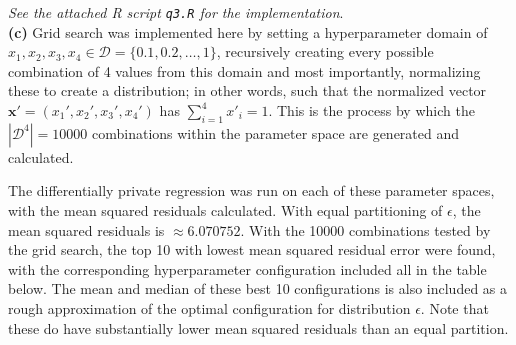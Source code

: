 \documentclass[12pt]{article}
\begin{document}
\emph{See the attached R script \texttt{q3.R} for the implementation}.\\

\textbf{(c)} Grid search was implemented here by setting a hyperparameter domain of $x_1, x_2, x_3, x_4 \in \mathcal{D} = \{0.1, 0.2, \dots, 1\}$, recursively creating every possible combination of 4 values from this domain and most importantly, normalizing these to create a distribution; in other words, such that the normalized vector $\mathbf{x}' = (x_1', x_2', x_3', x_4')$ has $\sum_{i=1}^4x'_i = 1$. This is the process by which the $|\mathcal{D}^4| = 10000$ combinations within the parameter space are generated and calculated.

The differentially private regression was run on each of these parameter spaces, with the mean squared residuals calculated. With equal partitioning of $\epsilon$, the mean squared residuals is $\approx 6.070752$. With the 10000 combinations tested by the grid search, the top 10 with lowest mean squared residual error were found, with the corresponding hyperparameter configuration included all in the table below. The mean and median of these best 10 configurations is also included as a rough approximation of the optimal configuration for distribution $\epsilon$. Note that these do have substantially lower mean squared residuals than an equal partition.
\end{document}
